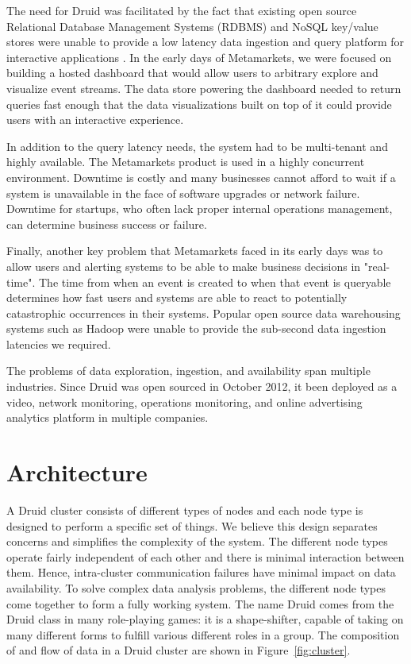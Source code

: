 \documentclass{acm_proc_article-sp}
\begin{document}
The need for Druid was facilitated by the fact that existing open source
Relational Database Management Systems (RDBMS) and NoSQL key/value stores were
unable to provide a low latency data ingestion and query platform for
interactive applications \cite{tschetter2011druid}. In the early days of
Metamarkets, we were focused on building a hosted dashboard that would allow
users to arbitrary explore and visualize event streams.  The data store
powering the dashboard needed to return queries fast enough that the data
visualizations built on top of it could provide users with an interactive
experience. 

In addition to the query latency needs, the system had to be multi-tenant and
highly available. The Metamarkets product is used in a highly concurrent
environment. Downtime is costly and many businesses cannot afford to wait if a
system is unavailable in the face of software upgrades or network failure.
Downtime for startups, who often lack proper internal operations management, can
determine business success or failure.  

Finally, another key problem that Metamarkets faced in its early days was to
allow users and alerting systems to be able to make business decisions in
"real-time". The time from when an event is created to when that
event is queryable determines how fast users and systems are able to react to
potentially catastrophic occurrences in their systems. Popular open source data
warehousing systems such as Hadoop were unable to provide the sub-second data ingestion
latencies we required. 

The problems of data exploration, ingestion, and availability span multiple
industries. Since Druid was open sourced in October 2012, it been deployed as a
video, network monitoring, operations monitoring, and online advertising
analytics platform in multiple companies.

\section{Architecture}
\label{sec:architecture}
A Druid cluster consists of different types of nodes and each node type is
designed to perform a specific set of things. We believe this design separates
concerns and simplifies the complexity of the system. The different node types
operate fairly independent of each other and there is minimal interaction
between them. Hence, intra-cluster communication failures have minimal impact
on data availability.  To solve complex data analysis problems, the different
node types come together to form a fully working system.  The name Druid comes
from the Druid class in many role-playing games: it is a shape-shifter, capable
of taking on many different forms to fulfill various different roles in a
group. The composition of and flow of data in a Druid cluster are shown in
Figure~\ref{fig:cluster}.
\end{document}
